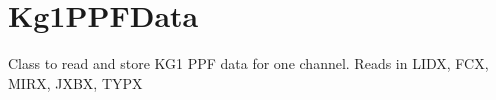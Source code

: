 \documentclass[letterpaper,10pt,english]{sphinxmanual}
\begin{document}
\begin{fulllineitems}
\begin{fulllineitems}
\begin{quote}
\begin{description}
\end{description}\end{quote}

\end{fulllineitems}


\end{fulllineitems}



\section{Kg1PPFData}
\label{kg1_ppf_data:kg1ppfdata}\label{kg1_ppf_data:module-kg1_ppf_data}\label{kg1_ppf_data::doc}
Class to read and store KG1 PPF data for one channel.
Reads in LIDX, FCX, MIRX, JXBX, TYPX
\end{document}
